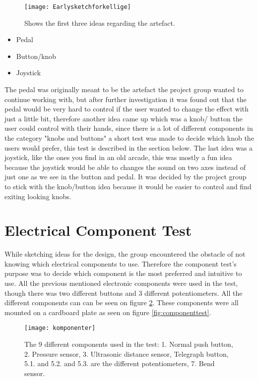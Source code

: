 \begin{figure}[!h] 
\centering
\texttt{[image: Earlysketchforkellige]}
\caption{\label{fig:Earlysketchforkellige} Shows the first three ideas regarding the artefact.}
\end{figure}

\begin{itemize}
\item Pedal
\item Button/knob 
\item Joystick 
\end{itemize}

The pedal was originally meant to be the artefact the project group wanted to continue working with, but after further investigation it was found out that the pedal would be very hard to control if the user wanted to change the effect with just a little bit, therefore another idea came up which was a knob/ button the user could control with their hands, since there is a lot of different components in the category "knobs and buttons" a short test was made to decide which knob the users would prefer, this test is described in the section below. 
The last idea was a joystick, like the ones you find in an old arcade, this was mostly a fun idea because the joystick would be able to changes the sound on two axes instead of just one as we see in the button and pedal. It was decided by the project group to stick with the knob/button idea because it would be easier to control and find exiting looking knobs. 

\section{Electrical Component Test}
While sketching ideas for the design, the group encountered the obstacle of not knowing which electrical components to use. Therefore the component test's purpose was to decide which component is the most preferred and intuitive to use. All the previous mentioned electronic components were used in the test, though there was two different buttons and 3 different potentiometers. All the different components can can be seen on figure \ref{fig:komponenter}. These components were all mounted on a cardboard plate as seen on figure \ref{fig:componenttest}.

\begin{figure}[!h] 
\centering
\texttt{[image: komponenter]}
\caption{\label{fig:komponenter} The 9 different components used in the test: 1. Normal push button, 2. Pressure sensor, 3. Ultrasonic distance sensor, Telegraph button, 5.1. and 5.2. and 5.3. are the different potentiometers, 7. Bend sensor.}
\end{figure}

